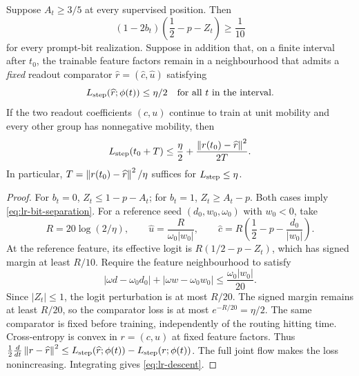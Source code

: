 \begin{lrlemma}
\label{lem:lr-readout-convergence}
Suppose $A_t\ge3/5$ at every supervised position.  Then
\begin{equation}\label{eq:lr-bit-separation}
 (1-2b_t)\left(\frac12-p-Z_t\right)\ge\frac1{10}
\end{equation}
for every prompt-bit realization.  Suppose in addition that, on a
finite interval after $t_0$, the trainable feature factors remain in a
neighbourhood that admits a \emph{fixed} readout comparator
$\widehat r=(\widehat c,\widehat u)$ satisfying
\begin{equation}\label{eq:lr-comparator}
 L_{\mathrm{step}}(\widehat r;\phi(t))\le\eta/2
 \quad\text{for all }t\text{ in the interval}.
\end{equation}
If the two readout coefficients $(c,u)$ continue to train at unit
mobility and every other group has nonnegative mobility, then
\begin{equation}\label{eq:lr-descent}
 L_{\mathrm{step}}(t_0+T)\le\frac\eta2+
 \frac{\left\lVert r(t_0)-\widehat r\right\rVert^2}{2T}.
\end{equation}
In particular, $T=\left\lVert r(t_0)-\widehat r\right\rVert^2/\eta$ suffices for
$L_{\mathrm{step}}\le\eta$.
\end{lrlemma}
\begin{proof}
For $b_t=0$, $Z_t\le1-p-A_t$; for $b_t=1$,
$Z_t\ge A_t-p$.  Both cases imply
\eqref{eq:lr-bit-separation}.
For a reference seed $(d_0,w_0,\omega_0)$ with $w_0<0$, take
\[
 R=20\log(2/\eta),\qquad
 \widehat u=\frac{R}{\omega_0|w_0|},\qquad
 \widehat c=R\left(\frac12-p-\frac{d_0}{|w_0|}\right).
\]
At the reference feature, its effective logit is
$R(1/2-p-Z_t)$, which has signed margin at least $R/10$.
Require the feature neighbourhood to satisfy
\begin{equation}\label{eq:lr-comparator-stability}
 |\omega d-\omega_0d_0|+|\omega w-\omega_0w_0|
 \le\frac{\omega_0|w_0|}{20}.
\end{equation}
Since $|Z_t|\le1$, the logit perturbation is at most $R/20$.
The signed margin remains at least $R/20$, so the comparator loss is
at most $e^{-R/20}=\eta/2$. The same comparator is fixed before training,
independently of the routing hitting time.
Cross-entropy is convex in $r=(c,u)$ at fixed feature factors.  Thus
$\frac12\frac{d}{dt}\left\lVert r-\widehat r\right\rVert^2
\le L_{\mathrm{step}}(\widehat r;\phi(t))-L_{\mathrm{step}}(r;\phi(t))$.
The full joint flow makes the loss nonincreasing.  Integrating gives
\eqref{eq:lr-descent}.
\end{proof}


